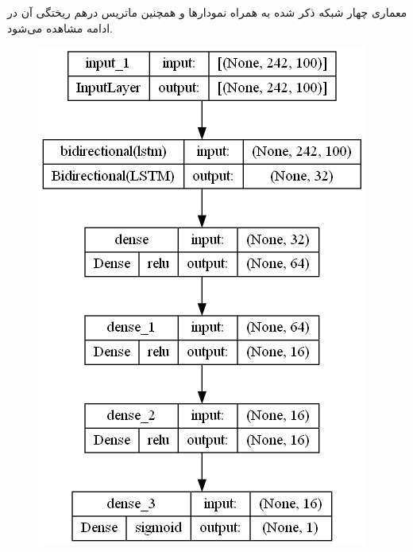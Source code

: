 \documentclass{article}
\begin{document}
معماری چهار شبکه ذکر شده به همراه نمودارها و همچنین ماتریس درهم ریختگی آن در ادامه مشاهده می‌شود.


\begin{figure}[!h]
    \centering\includegraphics[scale=.45]{./LSTM-[16]}
    \caption{}\label{fig.41}
\end{figure}
\end{document}
